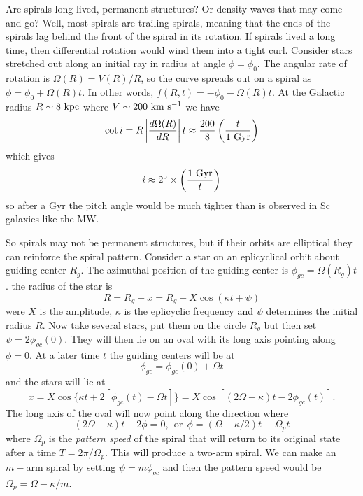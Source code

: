 \documentclass[]{article}
\begin{document}
Are spirals long lived, permanent structures?  Or density waves that may come and go?
Well, most spirals are trailing spirals, meaning that the ends of the spirals lag behind
the front of the spiral in its rotation.  If spirals lived a long time, then differential
rotation would wind them into a tight curl.  Consider stars stretched out along an
initial ray in radius at angle $\phi = \phi_0$.  The angular rate of rotation is
$\Omega(R) = V(R)/R$, so the curve spreads out on a spiral as $\phi = \phi_0 + \Omega(R)t$.
In other words, $f(R,t) = -\phi_0 - \Omega(R)t$.  At the Galactic radius $R\sim8~\mathrm{kpc}$
where $V\sim200~\mathrm{km}~\mathrm{s}^{-1}$ we have
\begin{equation}
\cot i = R \left| \frac{d\Omega(R)}{dR}\right| t \approx \frac{200}{8}\left(\frac{t}{1~\mathrm{Gyr}}\right)
\end{equation}
\noindent
which gives
\begin{equation}
i\approx2^\circ \times \left(\frac{1~\mathrm{Gyr}}{t}\right)
\end{equation}
\noindent
so after a Gyr the pitch angle would be much tighter than is observed in Sc galaxies like the MW.

So spirals may not be permanent structures, but if their orbits are elliptical they can 
reinforce the spiral pattern.  Consider a star on an eplicyclical orbit about guiding
center $R_g$.  The azimuthal position of the guiding center is $\phi_{gc} = \Omega(R_g)t$.
the radius of the star is
\begin{equation}
R = R_g + x = R_g + X \cos(\kappa t + \psi)
\end{equation}
\noindent
were $X$ is the amplitude, $\kappa$ is the eplicyclic frequency and $\psi$ determines the initial
radius $R$.  Now take several stars, put them on the circle $R_g$ but then set $\psi = 2\phi_{gc}(0)$.
They will then lie on an oval with its long axis pointing along $\phi = 0$. At a later time $t$
the guiding centers will be at
\begin{equation}
\phi_{gc} = \phi_{gc}(0) + \Omega t
\end{equation}
\noindent
and the stars will lie at
\begin{equation}
x = X\cos\{\kappa t + 2[\phi_{gc}(t) - \Omega t]\} = X \cos[(2\Omega-\kappa)t - 2\phi_{gc}(t)].
\end{equation}
The long axis of the oval will now point along the direction where
\begin{equation}
(2\Omega-\kappa)t - 2\phi = 0,~~\mathrm{or}~~\phi=(\Omega-\kappa/2) t \equiv \Omega_p t
\end{equation}
\noindent
where $\Omega_p$ is the {\it pattern speed} of the spiral that will return to its original state after a time $T = 2\pi/\Omega_p$.
This will produce a two-arm spiral.  We can make an $m-$arm spiral by setting $\psi = m\phi_{gc}$ and 
then the pattern speed would be $\Omega_p = \Omega - \kappa/m$.
\end{document}
